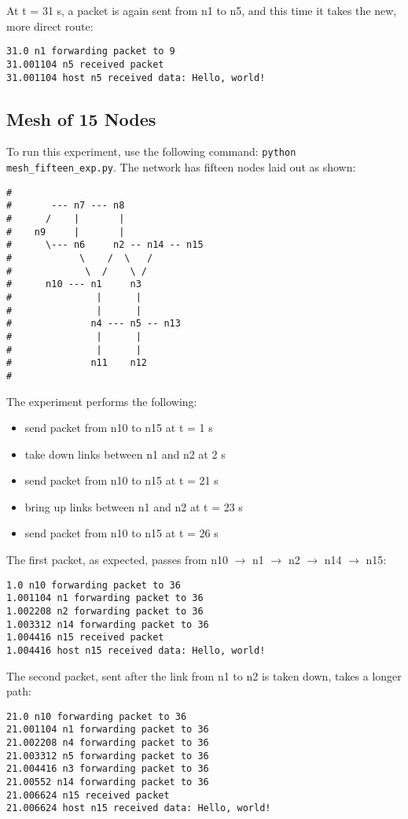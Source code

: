 \documentclass[11pt]{article}
\newcommand{\code}[1]{\texttt{#1}}
\begin{document}
At t = 31 s, a packet is again sent from n1 to n5, and this time it takes the new, more direct route:

\begin{lstlisting}
31.0 n1 forwarding packet to 9
31.001104 n5 received packet
31.001104 host n5 received data: Hello, world!
\end{lstlisting}

\subsection{Mesh of 15 Nodes}
To run this experiment, use the following command: \code{python mesh\_fifteen\_exp.py}. The network has fifteen nodes laid out as shown:

\begin{lstlisting}
#
#       --- n7 --- n8
#      /    |       |
#    n9     |       |
#      \--- n6     n2 -- n14 -- n15
#            \    /  \   /
#             \  /    \ /
#      n10 --- n1     n3
#               |      |
#               |      |
#              n4 --- n5 -- n13
#               |      |
#               |      |
#              n11    n12
#
\end{lstlisting}

The experiment performs the following:
\begin{itemize}
	\item send packet from n10 to n15 at t = 1 s
	\item take down links between n1 and n2 at 2 s
	\item send packet from n10 to n15 at t = 21 s
	\item bring up links between n1 and n2 at t = 23 s
	\item send packet from n10 to n15 at t = 26 s
\end{itemize}

The first packet, as expected, passes from n10 $\rightarrow$ n1 $\rightarrow$ n2 $\rightarrow$ n14 $\rightarrow$ n15:
\begin{lstlisting}
1.0 n10 forwarding packet to 36
1.001104 n1 forwarding packet to 36
1.002208 n2 forwarding packet to 36
1.003312 n14 forwarding packet to 36
1.004416 n15 received packet
1.004416 host n15 received data: Hello, world!
\end{lstlisting}

The second packet, sent after the link from n1 to n2 is taken down, takes a longer path:
\begin{lstlisting}
21.0 n10 forwarding packet to 36
21.001104 n1 forwarding packet to 36
21.002208 n4 forwarding packet to 36
21.003312 n5 forwarding packet to 36
21.004416 n3 forwarding packet to 36
21.00552 n14 forwarding packet to 36
21.006624 n15 received packet
21.006624 host n15 received data: Hello, world!
\end{lstlisting}
\end{document}
